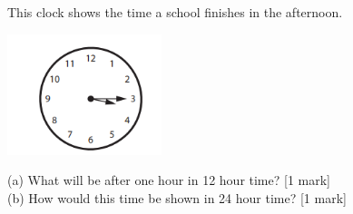 \documentclass{article}
\begin{document}
This clock shows the time a school finishes in the afternoon.
\begin{center}
    \includegraphics[width=4.5cm]{Year_6_Mixed_Tests/Clock1.png}
\end{center}
\begin{flushleft}
(a) What will be after one hour in 12 hour time? \hspace{2cm} [1 mark] \\
\vspace{30pt}
(b) How would this time be shown in 24 hour time? \hspace{2cm} [1 mark] \\
\end{flushleft}

 
\end{document}
